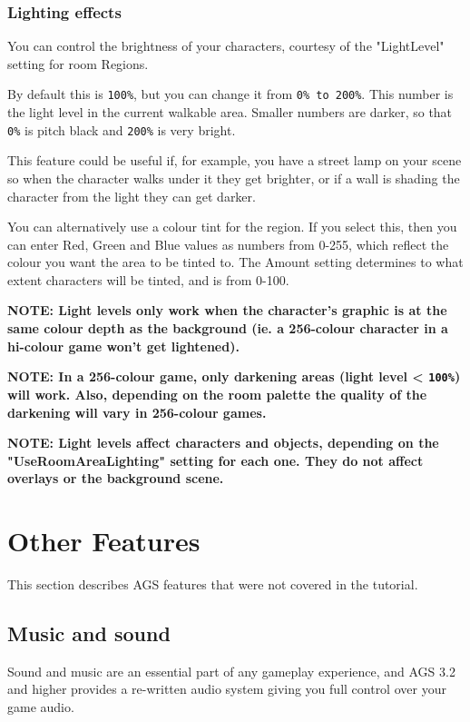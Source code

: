 \subsection{Lighting effects}%

You can control the brightness of your characters, courtesy of the "LightLevel" setting
for room Regions.

By default this is \verb$100%$, but you can change it from \verb$0% to 200%$.
This number is the light level in the current walkable area. Smaller
numbers are darker, so that \verb$0%$ is pitch black and \verb$200%$ is very bright.

This feature could be useful if, for example, you have a street lamp on your scene so
when the character walks under it they get brighter, or if a wall is shading
the character from the light they can get darker.

You can alternatively use a colour tint for the region. If you select this, then you
can enter Red, Green and Blue values as numbers from 0-255, which reflect the colour
you want the area to be tinted to. The Amount setting determines to what extent
characters will be tinted, and is from 0-100.

\bf{NOTE:} Light levels only work when the character's graphic is at the same
colour depth as the background (ie. a 256-colour character in a hi-colour
game won't get lightened).

\bf{NOTE:} In a 256-colour game, only darkening areas (light level < \verb$100%$) will work.
Also, depending on the room palette the quality of the darkening will vary
in 256-colour games.

\bf{NOTE:} Light levels affect characters and objects, depending on
the "UseRoomAreaLighting" setting for each one.
They do not affect overlays or the background scene.


\chapter{Other Features}%

This section describes AGS features that were not covered in the tutorial.

\section{Music and sound}\label{MusAndSound}%

Sound and music are an essential part of any gameplay experience, and AGS 3.2 and higher
provides a re-written audio system giving you full control over your game audio.

